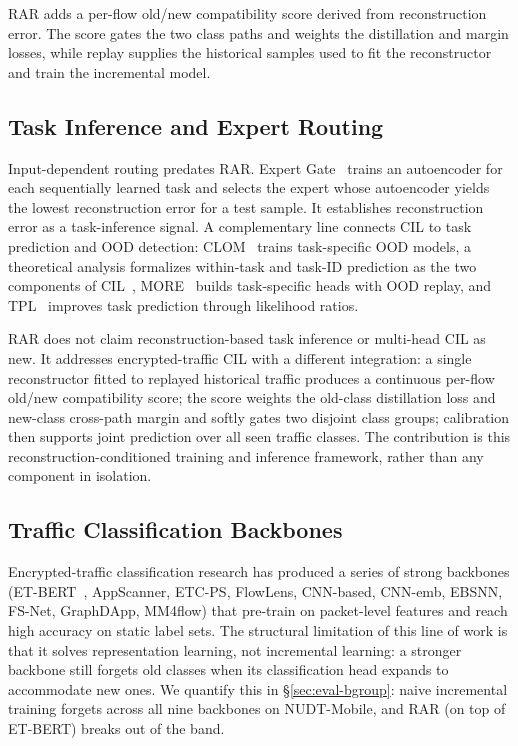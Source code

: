 RAR adds a per-flow old/new compatibility score derived from reconstruction error. The score gates the two class paths and weights the distillation and margin losses, while replay supplies the historical samples used to fit the reconstructor and train the incremental model.

\subsection{Task Inference and Expert Routing}

Input-dependent routing predates RAR. Expert Gate~\cite{aljundi2017expertgate} trains an autoencoder for each sequentially learned task and selects the expert whose autoencoder yields the lowest reconstruction error for a test sample. It establishes reconstruction error as a task-inference signal. A complementary line connects CIL to task prediction and OOD detection: CLOM~\cite{kim2022clom} trains task-specific OOD models, a theoretical analysis formalizes within-task and task-ID prediction as the two components of CIL~\cite{kim2022theoretical}, MORE~\cite{kim2022more} builds task-specific heads with OOD replay, and TPL~\cite{lin2024tpl} improves task prediction through likelihood ratios.

RAR does not claim reconstruction-based task inference or multi-head CIL as new. It addresses encrypted-traffic CIL with a different integration: a single reconstructor fitted to replayed historical traffic produces a continuous per-flow old/new compatibility score; the score weights the old-class distillation loss and new-class cross-path margin and softly gates two disjoint class groups; calibration then supports joint prediction over all seen traffic classes. The contribution is this reconstruction-conditioned training and inference framework, rather than any component in isolation.

\subsection{Traffic Classification Backbones}

Encrypted-traffic classification research has produced a series of strong backbones (ET-BERT~\cite{lin2022etbert}, AppScanner, ETC-PS, FlowLens, CNN-based, CNN-emb, EBSNN, FS-Net, GraphDApp, MM4flow) that pre-train on packet-level features and reach high accuracy on static label sets. The structural limitation of this line of work is that it solves representation learning, not incremental learning: a stronger backbone still forgets old classes when its classification head expands to accommodate new ones. We quantify this in \S\ref{sec:eval-bgroup}: naive incremental training forgets across all nine backbones on NUDT-Mobile, and RAR (on top of ET-BERT) breaks out of the band.

